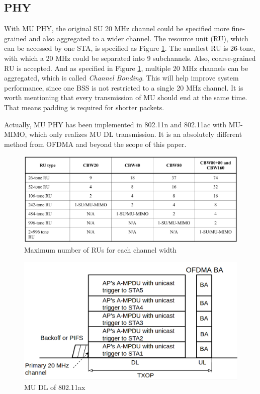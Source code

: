 \documentclass[journal]{IEEEtran}
\begin{document}
\subsection{PHY}
With MU PHY, the original SU 20 MHz channel could be specified more fine-grained and also aggregated to a wider channel.
The resource unit (RU), which can be accessed by one STA, is specified as Figure \ref{fig_RU_spec}. The smallest RU is 26-tone, with which a 20 MHz could be separated into 9 subchannels.
Also, coarse-grained RU is accepted.
And as specified in Figure \ref{fig_RU_spec}, multiple 20 MHz channels can be aggregated, which is called \textit{Channel Bonding}. 
This will help improve system performance, since one BSS is not restricted to a single 20 MHz channel.  
It is worth mentioning that every transmission of MU should end at the same time. That means padding is required for shorter packets.



Actually, MU PHY has been implemented in 802.11n and 802.11ac with MU-MIMO, which only realizes MU DL transmission.
It is an absolutely different method from OFDMA and beyond the scope of this paper. 

\begin{figure}[!t]
\includegraphics[scale=0.14]{./figure/RU_spec.jpg}
\caption{Maximum number of RUs for each channel width}
\label{fig_RU_spec}
\end{figure}


\begin{figure}[!t]
\includegraphics[scale=0.23]{./figure/fig_MU_DL.png}
\caption{MU DL of 802.11ax}
\label{fig_MU_DL}
\end{figure}
\end{document}
